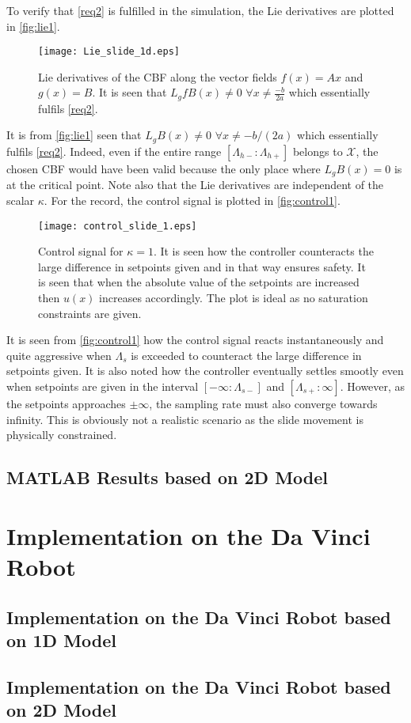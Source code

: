 To verify that \autoref{req2} is fulfilled in the simulation, the Lie derivatives are plotted in \autoref{fig:lie1}.
\begin{figure}[H]
	\center
		\texttt{[image: Lie\_slide\_1d.eps]}
	\caption{Lie derivatives of the CBF along the vector fields $f(x) = Ax$ and $g(x)=B$. It is seen that $L_gfB(x) \neq 0 \,\, \forall x \neq \frac{-b}{2a}$ which essentially fulfils \autoref{req2}.}
	\label{fig:lie1}
\end{figure}
It is from \autoref{fig:lie1} seen that $L_gB(x) \neq 0 \,\, \forall x \neq -b/(2a)$ which essentially fulfils \autoref{req2}. Indeed, even if the entire range $[\Lambda_{h-}:\Lambda_{h+}]$ belongs to $\mathcal{X}$, the chosen CBF would have been valid because the only place where $L_gB(x) = 0$ is at the critical point. Note also that the Lie derivatives are independent of the scalar $\kappa$.
For the record, the control signal is plotted in \autoref{fig:control1}.
\begin{figure}[H]
	\center
		\texttt{[image: control\_slide\_1.eps]}
	\caption{Control signal for $\kappa=1$. It is seen how the controller counteracts the large difference in setpoints given and in that way ensures safety. It is seen that when the absolute value of the setpoints are increased then $u(x)$ increases accordingly. The plot is ideal as no saturation constraints are given.}
	\label{fig:control1}
\end{figure}
It is seen from \autoref{fig:control1} how the control signal reacts instantaneously and quite aggressive when $\Lambda_s$ is exceeded to counteract the large difference in setpoints given. It is also noted how the controller eventually settles smootly even when setpoints are given in the interval $[-\infty:\Lambda_{s-}]$ and $[\Lambda_{s+}:\infty]$. However, as the setpoints approaches $\pm \infty$, the sampling rate must also converge towards infinity. This is obviously not a realistic scenario as the slide movement is physically constrained.
\subsection{MATLAB Results based on 2D Model}

\section{Implementation on the Da Vinci Robot}
\subsection{Implementation on the Da Vinci Robot based on 1D Model}

\subsection{Implementation on the Da Vinci Robot based on 2D Model}
